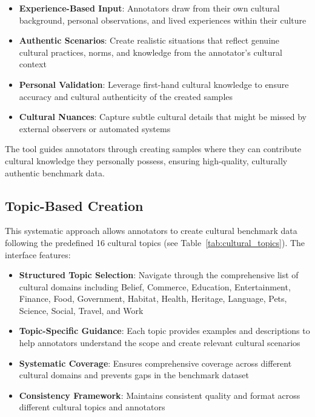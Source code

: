 \documentclass[11pt]{article}
\begin{document}
\begin{itemize}[itemsep=0.2em]
\item \textbf{Experience-Based Input}: Annotators draw from their own cultural background, personal observations, and lived experiences within their culture
\item \textbf{Authentic Scenarios}: Create realistic situations that reflect genuine cultural practices, norms, and knowledge from the annotator's cultural context
\item \textbf{Personal Validation}: Leverage first-hand cultural knowledge to ensure accuracy and cultural authenticity of the created samples
\item \textbf{Cultural Nuances}: Capture subtle cultural details that might be missed by external observers or automated systems
\end{itemize}

The tool guides annotators through creating samples where they can contribute cultural knowledge they personally possess, ensuring high-quality, culturally authentic benchmark data.

\subsection{Topic-Based Creation}

This systematic approach allows annotators to create cultural benchmark data following the predefined 16 cultural topics (see Table~\ref{tab:cultural_topics}). The interface features:

\begin{itemize}[itemsep=0.2em]
\item \textbf{Structured Topic Selection}: Navigate through the comprehensive list of cultural domains including Belief, Commerce, Education, Entertainment, Finance, Food, Government, Habitat, Health, Heritage, Language, Pets, Science, Social, Travel, and Work
\item \textbf{Topic-Specific Guidance}: Each topic provides examples and descriptions to help annotators understand the scope and create relevant cultural scenarios
\item \textbf{Systematic Coverage}: Ensures comprehensive coverage across different cultural domains and prevents gaps in the benchmark dataset
\item \textbf{Consistency Framework}: Maintains consistent quality and format across different cultural topics and annotators
\end{itemize}
\end{document}
